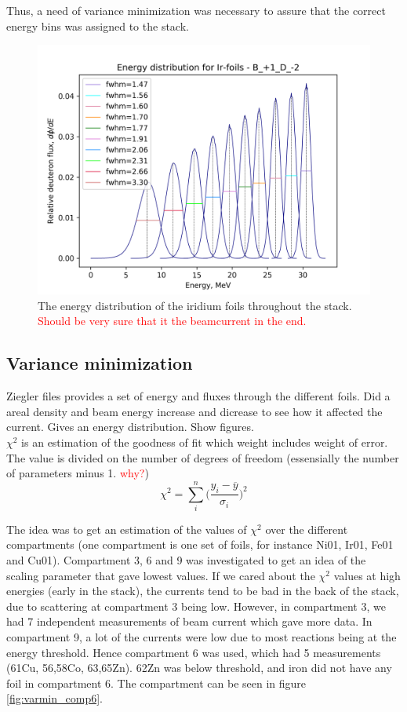 \documentclass[a4paper,11pt,twoside]{book}
\begin{document}
Thus, a need of variance minimization was necessary to assure that the correct energy bins was assigned to the stack. 

\begin{figure}
    \centering
    \includegraphics{Analysis/Ir_flux_distribution_B_+1_D_-2.png}
    \caption{The energy distribution of the iridium foils throughout the stack. \textcolor{red}{Should be very sure that it the beamcurrent in the end. } }
    \label{fig:Ir_Flux_Distr}
\end{figure}


\subsection{Variance minimization}
Ziegler files provides a set of energy and fluxes through the different foils. 
Did a areal density and beam energy increase and dicrease to see how it affected the current. Gives an energy distribution. Show figures.  \\

$\chi^2$ is an estimation of the goodness of fit which weight includes weight of error. The value is divided on the number of degrees of freedom (essensially the number of parameters minus 1. \textcolor{red}{why?})
\begin{equation} \label{eq:chi_squared}
    \chi^2 = \sum_{i}^n \Big(\frac{ y_i - \overline{y}}{ \sigma_i} \Big)^2 
\end{equation}

\noindent 
The idea was to get an estimation of the values of $\chi^2$ over the different compartments (one compartment is one set of foils, for instance Ni01, Ir01, Fe01 and Cu01). Compartment 3, 6 and 9 was investigated to get an idea of the scaling parameter that gave lowest values. If we cared about the $\chi^2$ values at high energies (early in the stack), the currents tend to be bad in the back of the stack, due to scattering at compartment 3 being low. However, in compartment 3, we had 7 independent measurements of beam current which gave more data. In compartment 9, a lot of the currents were low due to most reactions being at the energy threshold. Hence compartment 6 was used, which had 5 measurements (61Cu, 56,58Co, 63,65Zn). 62Zn was below threshold, and iron did not have any foil in compartment 6. The compartment can be seen in figure \ref{fig:varmin_comp6}. 
\end{document}
